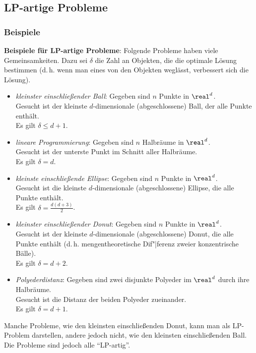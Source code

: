 \pagebreak

\subsection{%
    LP-artige Probleme%
}

\subsubsection{%
    Beispiele%
}

\textbf{Beispiele für LP-artige Probleme}:
Folgende Probleme haben viele Gemeinsamkeiten.
Dazu sei $\delta$ die Zahl an Objekten, die die optimale Lösung bestimmen
(d.\,h. wenn man eines von den Objekten weglässt, verbessert sich die Lösung).
\begin{itemize}
    \item
    \emph{kleinster einschließender Ball}:
    Gegeben sind $n$ Punkte in $\real^d$.\\
    Gesucht ist der kleinste $d$-dimensionale (abgeschlossene) Ball, der alle Punkte enthält.\\
    Es gilt $\delta \le d + 1$.

    \item
    \emph{lineare Programmierung}:
    Gegeben sind $n$ Halbräume in $\real^d$.\\
    Gesucht ist der unterste Punkt im Schnitt aller Halbräume.\\
    Es gilt $\delta = d$.

    \item
    \emph{kleinste einschließende Ellipse}:
    Gegeben sind $n$ Punkte in $\real^d$.\\
    Gesucht ist die kleinste $d$-dimensionale (abgeschlossene) Ellipse, die alle Punkte enthält.\\
    Es gilt $\delta = \frac{d(d+3)}{2}$.

    \item
    \emph{kleinster einschließender Donut}:
    Gegeben sind $n$ Punkte in $\real^d$.\\
    Gesucht ist der kleinste $d$-dimensionale (abgeschlossene) Donut, die alle Punkte enthält
    (d.\,h. mengentheoretische Dif"|ferenz zweier konzentrische Bälle).\\
    Es gilt $\delta = d + 2$.

    \item
    \emph{Polyederdistanz}:
    Gegeben sind zwei disjunkte Polyeder im $\real^d$ durch ihre Halbräume.\\
    Gesucht ist die Distanz der beiden Polyeder zueinander.\\
    Es gilt $\delta = d + 1$.
\end{itemize}
Manche Probleme, wie den kleinsten einschließenden Donut, kann man als LP-Problem darstellen,
andere jedoch nicht, wie den kleinsten einschließenden Ball.
Die Probleme sind jedoch alle "`LP-artig"'.

